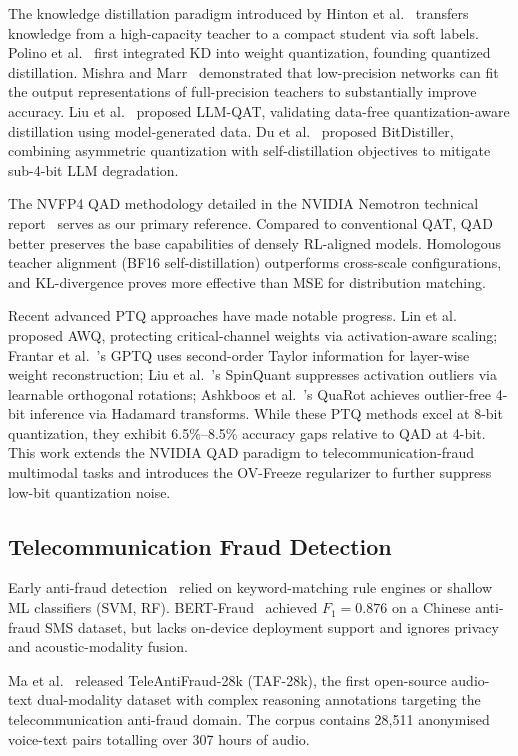 \documentclass[final,5p,times,number]{elsarticle}
\begin{document}
The knowledge distillation paradigm introduced by Hinton et al.~\cite{4} transfers knowledge from a high-capacity teacher to a compact student via soft labels. Polino et al.~\cite{5} first integrated KD into weight quantization, founding quantized distillation. Mishra and Marr~\cite{6} demonstrated that low-precision networks can fit the output representations of full-precision teachers to substantially improve accuracy. Liu et al.~\cite{7} proposed LLM-QAT, validating data-free quantization-aware distillation using model-generated data. Du et al.~\cite{8} proposed BitDistiller, combining asymmetric quantization with self-distillation objectives to mitigate sub-4-bit LLM degradation.

The NVFP4 QAD methodology detailed in the NVIDIA Nemotron technical report~\cite{3} serves as our primary reference. Compared to conventional QAT, QAD better preserves the base capabilities of densely RL-aligned models. Homologous teacher alignment (BF16 self-distillation) outperforms cross-scale configurations, and KL-divergence proves more effective than MSE for distribution matching.

Recent advanced PTQ approaches have made notable progress. Lin et al.~\cite{9} proposed AWQ, protecting critical-channel weights via activation-aware scaling; Frantar et al.~\cite{10}'s GPTQ uses second-order Taylor information for layer-wise weight reconstruction; Liu et al.~\cite{11}'s SpinQuant suppresses activation outliers via learnable orthogonal rotations; Ashkboos et al.~\cite{12}'s QuaRot achieves outlier-free 4-bit inference via Hadamard transforms. While these PTQ methods excel at 8-bit quantization, they exhibit 6.5\%--8.5\% accuracy gaps relative to QAD at 4-bit. This work extends the NVIDIA QAD paradigm to telecommunication-fraud multimodal tasks and introduces the OV-Freeze regularizer to further suppress low-bit quantization noise.

\subsection{Telecommunication Fraud Detection}

Early anti-fraud detection~\cite{13,14,15} relied on keyword-matching rule engines or shallow ML classifiers (SVM, RF). BERT-Fraud~\cite{16} achieved $F_1 = 0.876$ on a Chinese anti-fraud SMS dataset, but lacks on-device deployment support and ignores privacy and acoustic-modality fusion.

Ma et al.~\cite{1} released TeleAntiFraud-28k (TAF-28k), the first open-source audio-text dual-modality dataset with complex reasoning annotations targeting the telecommunication anti-fraud domain. The corpus contains 28{,}511 anonymised voice-text pairs totalling over 307 hours of audio.
\end{document}
